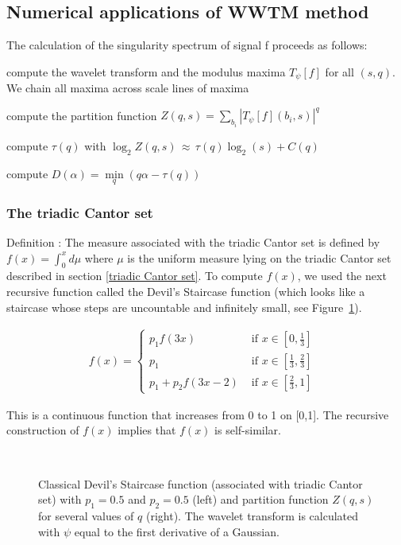 \subsection{Numerical applications of WWTM method}

The calculation of the singularity spectrum of signal f proceeds as follows:
\begin{list}{--}{\itemindent=-5mm \itemsep=-1mm}
\item compute the wavelet transform and the modulus maxima $T_\psi[f]$ for
all $(s,q)$. We chain all maxima across scale
lines of maxima
\item compute the partition 
function $Z(q,s) = \sum_{b_i} |T_\psi[f](b_i,s)|^q$
\item compute $\tau(q)$ with 
$\log_2{Z(q,s)}\,\approx\,\tau(q)\log_2(s)+C(q)$
\item compute $D(\alpha) = \underset{q}{\min}  (q\alpha-\tau(q))$
\end{list}

\subsubsection*{The triadic Cantor set}

Definition : The measure associated with the triadic Cantor set is defined by 
$f(x) = \int_0^x d\mu$ where $\mu$ is the uniform measure lying on the triadic 
Cantor set described in section \ref{triadic Cantor set}. To compute $f(x)$, we used the next recursive
function called the Devil's Staircase function 
(which looks like a staircase whose steps are
uncountable and infinitely small, see Figure~\ref{fig_5}). 

\begin{eqnarray}
f(x)=	\left\{   \begin{array}{ll}
	p_1f(3x)       & \mbox{ if $x \in [0,\frac{1}{3}]$}\\
	p_1            & \mbox{ if $x \in [\frac{1}{3}, \frac{2}{3}]$ }\\
	p_1+p_2f(3x-2) & \mbox{ if $x \in [\frac{2}{3}, 1]$}
	\end{array}
	\right.
\end{eqnarray}

This is a continuous function that increases  from 0 to 1 
on [0,1]. The recursive
construction of $f(x)$ implies that $f(x)$ is self-similar.

\begin{figure}[htb]
\centerline{
\hbox{
}}
\caption{Classical Devil's Staircase function (associated with
triadic Cantor set) with $p_1=0.5$ and $p_2=0.5$
(left) and partition function $Z(q,s)$ for several 
values of $q$ (right). The
wavelet transform is calculated with $\psi$ equal to the 
first derivative of a Gaussian.}
\label{fig_5}
\end{figure}


